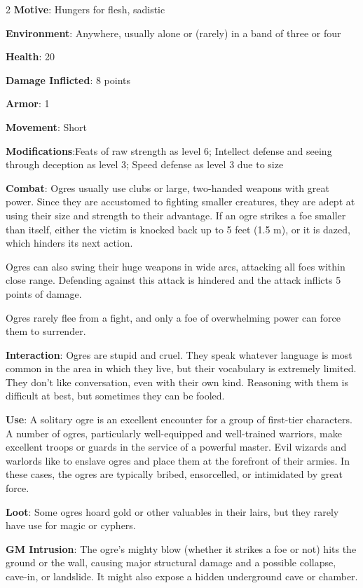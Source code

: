 \begin{multicols}{2}
\textbf{Motive}: Hungers for flesh, sadistic

\textbf{Environment}: Anywhere, usually alone or (rarely) in a band of three or four

\textbf{Health}: 20

\textbf{Damage Inflicted}: 8 points

\textbf{Armor}: 1

\textbf{Movement}: Short

\textbf{Modifications}:Feats of raw strength as level 6; Intellect defense and seeing through deception as level 3; Speed defense as level 3 due to size

\textbf{Combat}: Ogres usually use clubs or large, two-handed weapons with great power. Since they are accustomed to fighting smaller creatures, they are adept at using their size and strength to their advantage. If an ogre strikes a foe smaller than itself, either the victim is knocked back up to 5 feet (1.5 m), or it is dazed, which hinders its next action.

Ogres can also swing their huge weapons in wide arcs, attacking all foes within close range. Defending against this attack is hindered and the attack inflicts 5 points of damage.

Ogres rarely flee from a fight, and only a foe of overwhelming power can force them to surrender.

\textbf{Interaction}: Ogres are stupid and cruel. They speak whatever language is most common in the area in which they live, but their vocabulary is extremely limited. They don’t like conversation, even with their own kind. Reasoning with them is difficult at best, but sometimes they can be fooled.

\textbf{Use}: A solitary ogre is an excellent encounter for a group of first-tier characters. A number of ogres, particularly well-equipped and well-trained warriors, make excellent troops or guards in the service of a powerful master. Evil wizards and warlords like to enslave ogres and place them at the forefront of their armies. In these cases, the ogres are typically bribed, ensorcelled, or intimidated by great force.

\textbf{Loot}: Some ogres hoard gold or other valuables in their lairs, but they rarely have use for magic or cyphers.

\textbf{GM Intrusion}: The ogre’s mighty blow (whether it strikes a foe or not) hits the ground or the wall, causing major structural damage and a possible collapse, cave-in, or landslide. It might also expose a hidden underground cave or chamber.


\end{multicols}

